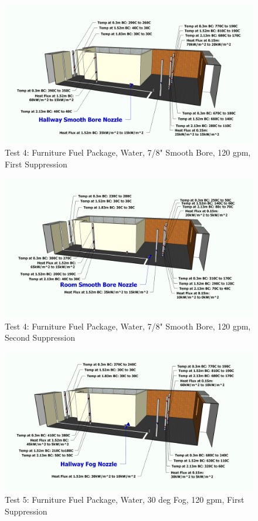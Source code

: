 \documentclass[12pt,oneside]{book}
\begin{document}
\begin{figure}[!ht]
	\includegraphics[width=6in]{../Figures/Pictures/Metric/DelCoSSTest4FirstSuppression}
	\caption{Test 4: Furniture Fuel Package, Water, 7/8" Smooth Bore, 120 gpm, First Suppression}
	\label{fig:Test_4_First_Suppression}
\end{figure}

\begin{figure}[!ht]
	\includegraphics[width=6in]{../Figures/Pictures/Metric/DelCoSSTest4SecondSuppression}
	\caption{Test 4: Furniture Fuel Package, Water, 7/8" Smooth Bore, 120 gpm, Second Suppression}
	\label{fig:Test_4_Second_Suppression}
\end{figure}

\clearpage

\begin{figure}[!ht]
	\includegraphics[width=6in]{../Figures/Pictures/Metric/DelCoFogTest5FirstSuppression}
	\caption{Test 5: Furniture Fuel Package, Water, 30 deg Fog, 120 gpm, First Suppression}
	\label{fig:Test_5_First_Suppression}
\end{figure}
\end{document}
